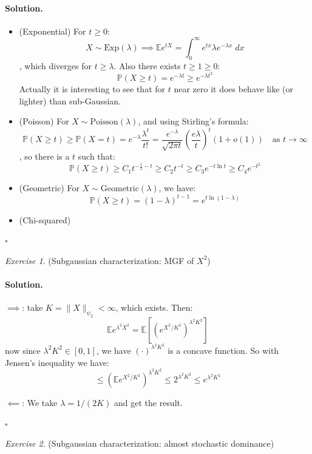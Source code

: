 \documentclass[11pt]{article}
\theoremstyle{definition}
\theoremstyle{remark}
\newtheorem{exercise}{Exercise}[section]
\newenvironment{solution}{\paragraph{Solution.}}{\hfill$\square$\medskip}
\newcommand{\E}{\mathbb{E}}
\newcommand{\Prob}{\mathbb{P}}
\newcommand{\1}{\mathbf{1}}
\newcommand{\subg}{{\psi_2}}
\begin{document}
\begin{solution}
	\begin{itemize}
		\item (Exponential) For \(t \geq 0\):
		\[
		X \sim \text{Exp}(\lambda) \implies \E e^{tX} = \int_0^\infty e^{tx} \lambda e^{-\lambda x} \; dx
		\], 
		which diverges for \(t \geq \lambda\). Also there exists \(t \geq 1 \geq 0\):
		\[
		 \Prob(X \geq t) = e^{-\lambda t} \geq e^{-\lambda t^2}
		\]
		Actually it is interesting to see that for \(t\) near zero it does behave like (or lighter) than sub-Gaussian.
		
		\item 
		(Poisson) For \(X \sim \text{Poisson}(\lambda)\), and using Stirling’s formula:
		\[
		\Prob(X \geq t) \geq \Prob(X = t) = e^{-\lambda} \frac{\lambda^t}{t!} 
		= \frac{e^{-\lambda} }{\sqrt{2\pi t}} (\frac{e\lambda}{t})^t (1 + o(1)) \quad \text{as } t \to \infty
 		\],
		so there is a \(t\) such that:
		\[
		\Prob(X \geq t) \geq C_1 t^{-\frac{1}{2} - t } \geq C_2 t^{-t} \geq C_3 e^{-t\ln t} \geq C_4 e^{-t^2} 
		\]
		
		\item (Geometric) For \(X \sim \text{Geometric}(\lambda) \), we have:
		\[
		\Prob(X\geq t) = (1-\lambda)^{t-1} = e^{t\ln(1-\lambda)}
		\]
		
		\item (Chi-squared)
		
	\end{itemize}
\end{solution}


\begin{exercise}
	(Subgaussian characterization: MGF of \(X^2\))
\end{exercise}

\begin{solution}
	\(\implies\): take \(K = \|X\|_\subg < \infty\), which exists. Then:
	\[
	\E e^{\lambda^2 X^2} = \E [(e^{ X^2 / K^2 })^{\lambda^2 K^2} ]
	\]
	now since \(\lambda^2K^2 \in [0,1]\), we have \( ( \cdot )^{\lambda^2K^2} \) is a concave function. So with Jensen's inequality we have:
	\[
	\leq (\E e^{X^2/K^2})^{\lambda^2 K^2} \leq 2^{\lambda^2K^2} \leq e^{\lambda^2 K^2}
	\]
	
	\(\impliedby\): We take \(\lambda = 1/(2K)\) and get the result.
	
	
\end{solution}

\begin{exercise}
(Subgaussian characterization: almost stochastic dominance)
\end{exercise}
\end{document}
